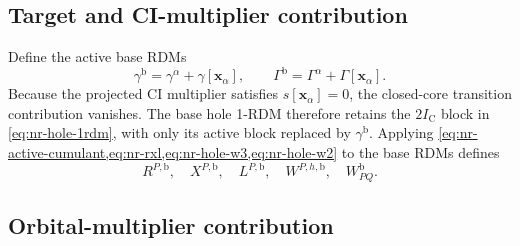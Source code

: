 \documentclass[aip,preprint,nofootinbib]{revtex4-1}
\newcommand{\core}{\mathrm{C}}
\begin{document}
\subsection{Target and CI-multiplier contribution}

Define the active base RDMs
\begin{equation}
 \gamma^{\mathrm b}=\gamma^\alpha+\gamma[\mathbf x_\alpha],
 \qquad
 \Gamma^{\mathrm b}=\Gamma^\alpha+\Gamma[\mathbf x_\alpha].
 \label{eq:nr-base-rdms}
\end{equation}
Because the projected CI multiplier satisfies $s[\mathbf x_\alpha]=0$, the
closed-core transition contribution vanishes.  The base hole 1-RDM therefore
retains the $2I_{\core}$ block in \cref{eq:nr-hole-1rdm}, with only its active
block replaced by $\gamma^{\mathrm b}$.  Applying
\cref{eq:nr-active-cumulant,eq:nr-rxl,eq:nr-hole-w3,eq:nr-hole-w2} to the base
RDMs defines
\begin{equation}
 R^{P,\mathrm b},\quad X^{P,\mathrm b},\quad L^{P,\mathrm b},
 \quad W^{P,h,\mathrm b},\quad W^{\mathrm b}_{PQ}.
\end{equation}

\subsection{Orbital-multiplier contribution}
\end{document}
